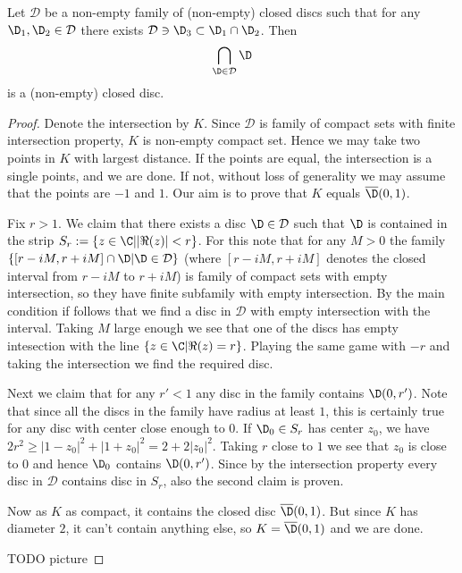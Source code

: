 \begin{lem}\label{disc_lemma}
	Let $\mathcal{D}$ be a non-empty family of (non-empty) closed discs such that for any $\D_{1}, \D_{2} \in \mathcal{D}$ there exists $\mathcal{D} \ni \D_{3} \subset \D_{1} \cap \D_{2}$. Then
	\begin{align*}
		\bigcap_{\D \in \mathcal{D}} \D
	\end{align*}
	is a (non-empty) closed disc.
\end{lem}
\begin{proof}
	Denote the intersection by $K$. Since $\mathcal{D}$ is family of compact sets with finite intersection property, $K$ is non-empty compact set. Hence we may take two points in $K$ with largest distance. If the points are equal, the intersection is a single points, and we are done. If not, without loss of generality we may assume that the points are $-1$ and $1$. Our aim is to prove that $K$ equals $\overline{\D}(0, 1)$.

	Fix $r > 1$. We claim that there exists a disc $\D \in \mathcal{D}$ such that $\D$ is contained in the strip $S_{r} := \{z \in \C | |\Re(z)| < r\}$. For this note that for any $M > 0$ the family $\{[r - i M, r + i M] \cap \D | \D \in \mathcal{D}\}$ (where $[r - i M, r + i M]$ denotes the closed interval from $r - i M$ to $r + i M$) is family of compact sets with empty intersection, so they have finite subfamily with empty intersection. By the main condition if follows that we find a disc in $\mathcal{D}$ with empty intersection with the interval. Taking $M$ large enough we see that one of the discs has empty intesection with the line $\{z \in \C | \Re(z) = r\}$. Playing the same game with $-r$ and taking the intersection we find the required disc.

	Next we claim that for any $r' < 1$ any disc in the family contains $\D(0, r')$. Note that since all the discs in the family have radius at least $1$, this is certainly true for any disc with center close enough to $0$. If $\D_{0} \in S_{r}$ has center $z_{0}$, we have $2 r^{2} \geq |1 - z_{0}|^2 + |1 + z_{0}|^2 = 2 + 2 |z_{0}|^2$. Taking $r$ close to $1$ we see that $z_{0}$ is close to $0$ and hence $\D_{0}$ contains $\D(0, r')$. Since by the intersection property every disc in $\mathcal{D}$ contains disc in $S_{r}$, also the second claim is proven.

	Now as $K$ as compact, it contains the closed disc $\overline{\D}(0, 1)$. But since $K$ has diameter $2$, it can't contain anything else, so $K = \overline{\D}(0, 1)$ and we are done.

	TODO picture
\end{proof}

